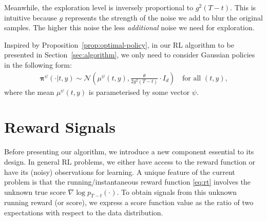 \documentclass[11pt]{article}
\newcommand{\bpi}{\boldsymbol{\pi}}
\begin{document}
 Meanwhile, the exploration level is inversely proportional to $g^2(T-t).$ This is intuitive because $g$ represents the strength of the noise we add to blur the original samples. The higher this noise the less {\it additional} noise we need for exploration. %



Inspired by Proposition~\ref{prop:optimal-policy}, in our RL algorithm to be presented in Section~\ref{sec:algorithm}, we only need to consider Gaussian policies in the following form:
\begin{align}\label{eq:pi-psi}
\bpi^{\psi}(\cdot|t,y)   \sim  \mathcal{N}\left(\mu^{\psi}(t,y), \frac{\theta}{2 g^2(T-t)}  \cdot I_{d} \right) \quad \text{for all $(t, y)$,}%
\end{align}
where the mean $\mu^{\psi}(t,y)$ is parameterised by some vector $\psi$.


\section{Reward Signals}

Before presenting our algorithm, we introduce a new component essential to its design.
In general RL problems, we either have access to the reward function or have its (noisy) observations for  learning. A unique feature of the current problem is that the running/instantaneous reward function \eqref{eq:rt} involves the unknown true score $\nabla\log p_{T-t}(\cdot)$. To obtain signals from this unknown running reward (or score), we express a score function value as the ratio of two expectations with respect to the data distribution.
\end{document}
